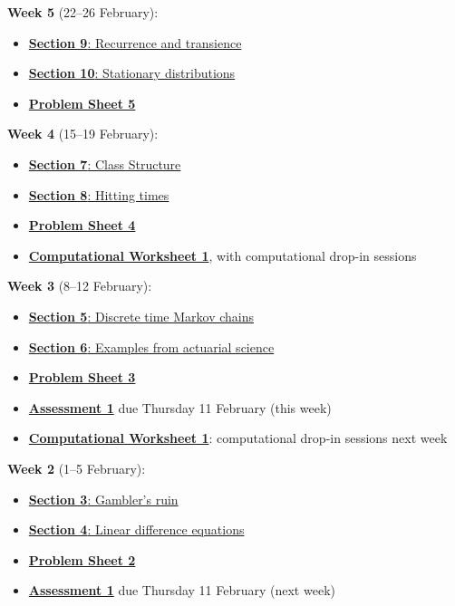 \documentclass[
  a4paper,
]{article}
\providecommand{\tightlist}{%
  \setlength{\itemsep}{0pt}\setlength{\parskip}{0pt}}
\theoremstyle{definition}
\theoremstyle{definition}
\theoremstyle{definition}
\theoremstyle{remark}
\begin{document}
\textbf{Week 5} (22--26 February):

\begin{itemize}
\tightlist
\item
  \protect\hyperlink{S09-recurrence-transience}{\textbf{Section 9}: Recurrence and transience}
\item
  \protect\hyperlink{S10-stationary-distributions}{\textbf{Section 10}: Stationary distributions}
\item
  \protect\hyperlink{P05}{\textbf{Problem Sheet 5}}
\end{itemize}

\textbf{Week 4} (15--19 February):

\begin{itemize}
\tightlist
\item
  \protect\hyperlink{S07-classes}{\textbf{Section 7}: Class Structure}
\item
  \protect\hyperlink{S08-hitting-times}{\textbf{Section 8}: Hitting times}
\item
  \protect\hyperlink{P04}{\textbf{Problem Sheet 4}}
\item
  \protect\hyperlink{computing}{\textbf{Computational Worksheet 1}}, with computational drop-in sessions
\end{itemize}

\textbf{Week 3} (8--12 February):

\begin{itemize}
\tightlist
\item
  \protect\hyperlink{S05-markov-chains}{\textbf{Section 5}: Discrete time Markov chains}
\item
  \protect\hyperlink{S06-examples}{\textbf{Section 6}: Examples from actuarial science}
\item
  \protect\hyperlink{P03}{\textbf{Problem Sheet 3}}
\item
  \protect\hyperlink{A1}{\textbf{Assessment 1}} due Thursday 11 February (this week)
\item
  \protect\hyperlink{computing}{\textbf{Computational Worksheet 1}}: computational drop-in sessions next week
\end{itemize}

\textbf{Week 2} (1--5 February):

\begin{itemize}
\tightlist
\item
  \protect\hyperlink{S03-gamblers-ruin}{\textbf{Section 3}: Gambler's ruin}
\item
  \protect\hyperlink{S04-ldes}{\textbf{Section 4}: Linear difference equations}
\item
  \protect\hyperlink{P02}{\textbf{Problem Sheet 2}}
\item
  \protect\hyperlink{A1}{\textbf{Assessment 1}} due Thursday 11 February (next week)
\end{itemize}
\end{document}
